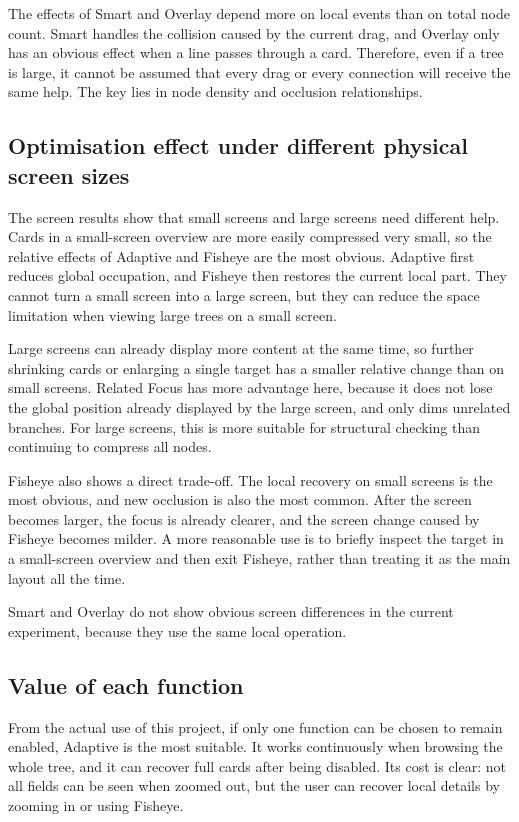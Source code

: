 The effects of Smart and Overlay depend more on local events than on total node count. Smart handles the collision caused by the current drag, and Overlay only has an obvious effect when a line passes through a card. Therefore, even if a tree is large, it cannot be assumed that every drag or every connection will receive the same help. The key lies in node density and occlusion relationships.

\subsection{Optimisation effect under different physical screen sizes}

The screen results show that small screens and large screens need different help. Cards in a small-screen overview are more easily compressed very small, so the relative effects of Adaptive and Fisheye are the most obvious. Adaptive first reduces global occupation, and Fisheye then restores the current local part. They cannot turn a small screen into a large screen, but they can reduce the space limitation when viewing large trees on a small screen.

Large screens can already display more content at the same time, so further shrinking cards or enlarging a single target has a smaller relative change than on small screens. Related Focus has more advantage here, because it does not lose the global position already displayed by the large screen, and only dims unrelated branches. For large screens, this is more suitable for structural checking than continuing to compress all nodes.

Fisheye also shows a direct trade-off. The local recovery on small screens is the most obvious, and new occlusion is also the most common. After the screen becomes larger, the focus is already clearer, and the screen change caused by Fisheye becomes milder. A more reasonable use is to briefly inspect the target in a small-screen overview and then exit Fisheye, rather than treating it as the main layout all the time.

Smart and Overlay do not show obvious screen differences in the current experiment, because they use the same local operation.

\subsection{Value of each function}

From the actual use of this project, if only one function can be chosen to remain enabled, Adaptive is the most suitable. It works continuously when browsing the whole tree, and it can recover full cards after being disabled. Its cost is clear: not all fields can be seen when zoomed out, but the user can recover local details by zooming in or using Fisheye.

